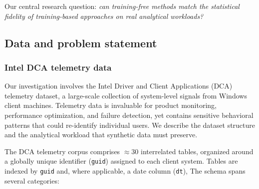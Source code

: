 \documentclass[12pt,letterpaper]{article}
\renewcommand{\_}{\textunderscore\allowbreak}
\begin{document}
Our central research question: \textit{can training-free methods match the statistical fidelity of training-based approaches on real analytical workloads?}

\newpage

\subsection{Data and problem statement}

\subsubsection{Intel DCA telemetry data}

Our investigation involves the Intel Driver and Client Applications (DCA) telemetry dataset, a large-scale collection of system-level signals from Windows client machines. Telemetry data is invaluable for product monitoring, performance optimization, and failure detection, yet contains sensitive behavioral patterns that could re-identify individual users. We describe the dataset structure and the analytical workload that synthetic data must preserve.

The DCA telemetry corpus comprises $\approx 30$ interrelated tables, organized around a globally unique identifier (\texttt{guid}) assigned to each client system. Tables are indexed by \texttt{guid} and, where applicable, a date column (\texttt{dt}), The schema spans several categories:
\end{document}
